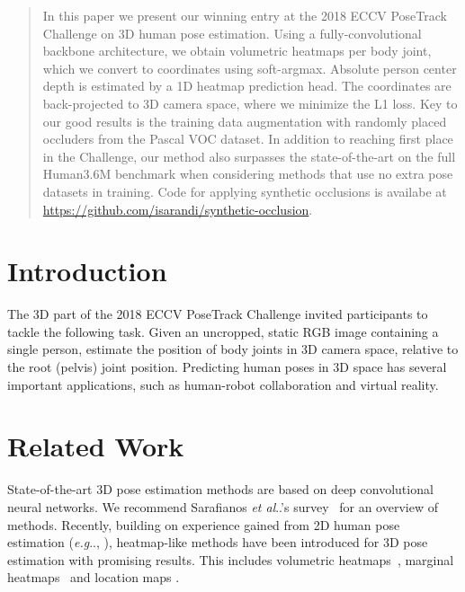 \documentclass[10pt,twocolumn,letterpaper]{article}
\makeatletter
\DeclareRobustCommand\onedot{\futurelet\@let@token\@onedot}
\def\@onedot{\ifx\@let@token.\else.\null\fi\xspace}
\def\eg{\emph{e.g}\onedot} \def\Eg{\emph{E.g}\onedot}
\def\etal{\emph{et al}\onedot}
\newcommand{\PARbegin}[1]{\noindent {\bf #1~}}
\makeatother
\begin{document}
\maketitle
\begin{abstract}
In this paper we present our winning entry at the 2018 ECCV PoseTrack Challenge on 3D human pose estimation. Using a fully-convolutional backbone architecture, we obtain volumetric heatmaps per body joint, which we convert to coordinates using soft-argmax. Absolute person center depth is estimated by a 1D heatmap prediction head. The coordinates are back-projected to 3D camera space, where we minimize the L1 loss. Key to our good results is the training data augmentation with randomly placed occluders from the Pascal VOC dataset. In addition to reaching first place in the Challenge, our method also surpasses the state-of-the-art on the full Human3.6M benchmark when considering methods that use no extra pose datasets in training. Code for applying synthetic occlusions is availabe at \url{https://github.com/isarandi/synthetic-occlusion}.
\end{abstract}

\section{Introduction}

The 3D part of the 2018 ECCV PoseTrack Challenge invited participants to tackle the following task. Given an uncropped, static RGB image containing a single person, estimate the position of  body joints in 3D camera space, relative to the root (pelvis) joint position.
Predicting human poses in 3D space has several important applications, such as human-robot collaboration and virtual reality. 

\section{Related Work}

\PARbegin{3D Human Pose Estimation.} State-of-the-art 3D pose estimation methods are based on deep convolutional neural networks. We recommend Sarafianos \etal's survey~\cite{Sarafianos16CVIU} for an overview of methods. Recently, building on experience gained from 2D human pose estimation (\eg, \cite{Newell16ECCV}), heatmap-like methods have been introduced for 3D pose estimation with promising results. This includes volumetric heatmaps~\cite{Pavlakos17CVPR}\cite{Sun18ECCV}\cite{Luvizon18CVPR}, marginal heatmaps~\cite{Nibali18arXiv2} and location maps \cite{Mehta17TOG}.
\end{document}
